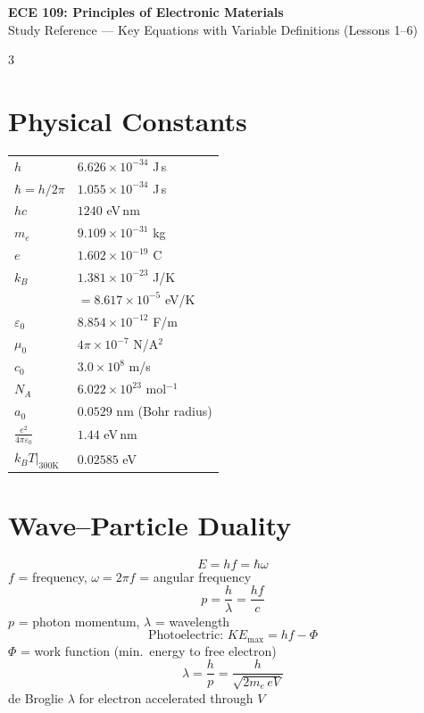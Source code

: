 \documentclass[9pt]{extarticle}
\newcommand{\vardef}[1]{{\footnotesize\color{defgray}#1}}
\begin{document}
\begin{center}
{\large\bfseries\color{gold} ECE 109: Principles of Electronic Materials}\\[2pt]
{\small Study Reference --- Key Equations with Variable Definitions (Lessons 1--6)}
\end{center}
\vspace{-4pt}

\begin{multicols}{3}

\section{Physical Constants}
\begin{tabular}{@{}l@{\;}l@{}}
$h$ & $6.626\times10^{-34}$ J\,s \\
$\hbar = h/2\pi$ & $1.055\times10^{-34}$ J\,s \\
$hc$ & $1240$ eV\,nm \\
$m_e$ & $9.109\times10^{-31}$ kg \\
$e$ & $1.602\times10^{-19}$ C \\
$k_B$ & $1.381\times10^{-23}$ J/K \\
& $= 8.617\times10^{-5}$ eV/K \\
$\varepsilon_0$ & $8.854\times10^{-12}$ F/m \\
$\mu_0$ & $4\pi\times10^{-7}$ N/A$^2$ \\
$c_0$ & $3.0\times10^{8}$ m/s \\
$N_A$ & $6.022\times10^{23}$ mol$^{-1}$ \\
$a_0$ & $0.0529$ nm (Bohr radius) \\
$\frac{e^2}{4\pi\varepsilon_0}$ & $1.44$ eV\,nm \\
$k_BT|_{300\text{K}}$ & $0.02585$ eV \\
\end{tabular}

\section{Wave--Particle Duality}
\[E = hf = \hbar\omega\]
\vardef{$f$ = frequency, $\omega = 2\pi f$ = angular frequency}
\[p = \frac{h}{\lambda} = \frac{hf}{c}\]
\vardef{$p$ = photon momentum, $\lambda$ = wavelength}
\[\text{Photoelectric: } KE_{\max} = hf - \Phi\]
\vardef{$\Phi$ = work function (min.\ energy to free electron)}
\[\lambda = \frac{h}{p} = \frac{h}{\sqrt{2m_e\,eV}}\]
\vardef{de Broglie $\lambda$ for electron accelerated through $V$}


\end{multicols}
\end{document}
